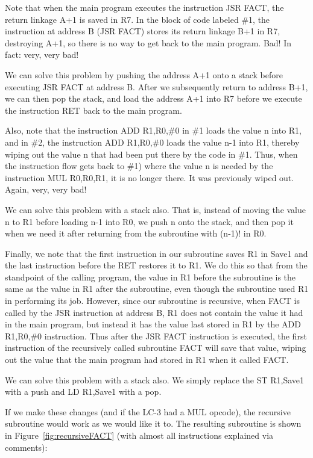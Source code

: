 \documentclass{patt}
\begin{document}
\FloatBarrier
Note that when the main program executes the instruction JSR FACT, the 
return linkage A+1 is saved in R7.  In the block of code labeled \#1, the 
instruction at address B (JSR FACT) stores its return linkage B+1 in R7, 
destroying A+1, so there is no way to get back to the main program.  Bad!  
In fact: very, very bad!

We can solve this problem by pushing the address A+1 onto a stack before 
executing JSR FACT at address B.  After we subsequently return to 
address B+1, we can then pop the stack, and load the address A+1 into R7
before we execute the instruction RET back to the main program.

Also, note that the instruction ADD R1,R0,\#0 in \#1 loads the value n
into R1, and in \#2, the instruction ADD R1,R0,\#0 loads the value n-1 into
R1, thereby wiping out the value n that had been put there by the code in \#1.
Thus, when the instruction flow gets back to \#1) where the value n is needed
by the instruction MUL R0,R0,R1, it is no longer there.  It was previously
wiped out.  Again, very, very bad!

We can solve this problem with a stack also.  That is, instead of moving the
value n to R1 before loading n-1 into R0, we push n onto the stack, and then
pop it when we need it after returning from the subroutine with (n-1)! in R0.

Finally, we note that the first instruction in our subroutine saves R1 in
Save1 and the last instruction before the RET restores it to R1.  We do this
so that from the standpoint of the calling program, the value in R1 before the 
subroutine is the same as the value in R1 after the subroutine, even though 
the subroutine used R1 in performing its job.  However, since our subroutine
is recursive, when FACT is called by the JSR instruction at address B, R1 does 
not contain the value it had in the main program, but instead it has the value
last stored in R1 by the ADD R1,R0,\#0 instruction.  Thus after the JSR FACT
instruction is executed, the first instruction of the recursively called
subroutine FACT will save that value, wiping out the value that the main
program had stored in R1 when it called FACT.  

We can solve this problem with a stack also.  We simply replace the 
ST R1,Save1 with a push and LD R1,Save1 with a pop.  

If we make these changes (and if the LC-3 had a MUL opcode), the recursive
subroutine would work as we would like it to.  The resulting subroutine is
shown in Figure~\ref{fig:recursiveFACT}
(with almost all instructions explained via comments):
\end{document}
